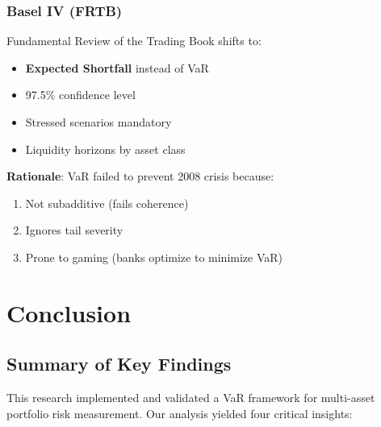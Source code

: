 \documentclass[12pt,a4paper]{article}
\begin{document}
\subsubsection{Basel IV (FRTB)}

Fundamental Review of the Trading Book shifts to:
\begin{itemize}
    \item \textbf{Expected Shortfall} instead of VaR
    \item 97.5\% confidence level
    \item Stressed scenarios mandatory
    \item Liquidity horizons by asset class
\end{itemize}

\textbf{Rationale}: VaR failed to prevent 2008 crisis because:
\begin{enumerate}
    \item Not subadditive (fails coherence)
    \item Ignores tail severity
    \item Prone to gaming (banks optimize to minimize VaR)
\end{enumerate}

\newpage
\section{Conclusion}

\subsection{Summary of Key Findings}

This research implemented and validated a VaR framework for multi-asset portfolio risk measurement. Our analysis yielded four critical insights:
\end{document}

